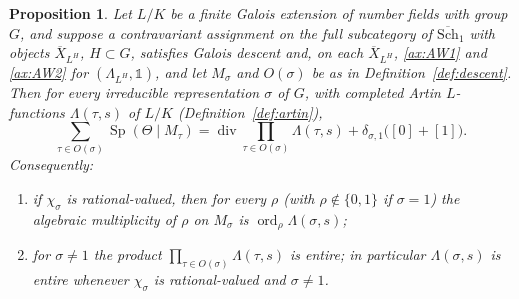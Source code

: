 \documentclass[11pt]{amsart}
\theoremstyle{plain}
\newtheorem{proposition}[theorem]{Proposition}
\theoremstyle{definition}
\theoremstyle{remark}
\numberwithin{equation}{section}
\newcommand{\Xbar}{\overline{X}}
\newcommand{\Schbar}{\overline{\mathrm{Sch}}}
\DeclareMathOperator{\divisor}{div}
\DeclareMathOperator{\ord}{ord}
\begin{document}
\begin{proposition}\label{prop:descent}
Let $L/K$ be a finite Galois extension of number fields with group $G$,
and suppose a contravariant assignment on the full subcategory of
$\Schbar_1$ with objects $\Xbar_{L^H}$, $H\subset G$, satisfies Galois
descent and, on each $\Xbar_{L^H}$,
\ref{ax:AW1} and \ref{ax:AW2} for $(\Lambda_{L^H},\mathbb 1)$, and let
$M_\sigma$ and $O(\sigma)$ be as in Definition~\ref{def:descent}. Then
for every irreducible representation $\sigma$ of $G$, with completed
Artin $L$-functions $\Lambda(\tau,s)$ of $L/K$
(Definition~\ref{def:artin}),
\[
\sum_{\tau\in O(\sigma)}\operatorname{Sp}(\Theta\mid M_\tau)=
\divisor\prod_{\tau\in O(\sigma)}\Lambda(\tau,s)
+\delta_{\sigma,1}\bigl([0]+[1]\bigr).
\]
Consequently:
\begin{enumerate}[label=(\roman*)]
\item\label{item:desc-mult} if $\chi_\sigma$ is rational-valued, then
  for every $\rho$ (with $\rho\notin\{0,1\}$ if $\sigma=1$) the
  algebraic multiplicity of $\rho$ on $M_\sigma$ is
  $\ord_\rho\Lambda(\sigma,s)$;
\item\label{item:desc-artin} for $\sigma\ne1$ the product
  $\prod_{\tau\in O(\sigma)}\Lambda(\tau,s)$ is entire; in particular
  $\Lambda(\sigma,s)$ is entire whenever $\chi_\sigma$ is
  rational-valued and $\sigma\ne1$.
\end{enumerate}
\end{proposition}
\end{document}
